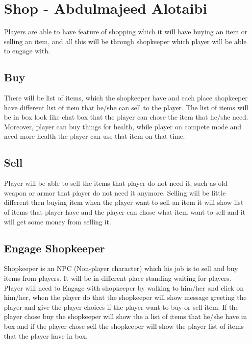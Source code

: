 \documentclass[11pt]{article}
\begin{document}
\section{Shop - Abdulmajeed Alotaibi}
	Players are able to have feature of shopping which it will have buying an item or selling an item, and all this will be through shopkeeper which player will be able to engage with.

		\subsection{Buy}
		
			There will be list of items, which the shopkeeper have and each place shopkeeper have different list of item that he/she can sell to the player. The list of items will be in box look like chat box that the player can chose the item that he/she need. Moreover, player can buy things for health, while player on compete mode and need more health the player can use that item on that time.

		\subsection{Sell}
 
			Player will be able to sell the items that player do not need it, such as old weapon or armor that player do not need it anymore. Selling will be little different then buying item when the player want to sell an item it will show list of items that player have and the player can chose what item want to sell and it will get some money from selling it.
	
		\subsection{Engage Shopkeeper}
			Shopkeeper is an NPC (Non-player character) which his job is to sell and buy items from players. It will be in different place standing waiting for players. Player will need to Engage with shopkeeper by walking to him/her and click on him/her, when the player do that the shopkeeper will show message greeting the player and give the player choices if the player want to buy or sell item. If the player chose buy the shopkeeper will show the a list of items that he/she have in box and if the player chose sell the shopkeeper will show the player list of items that the player have in box.
\end{document}
